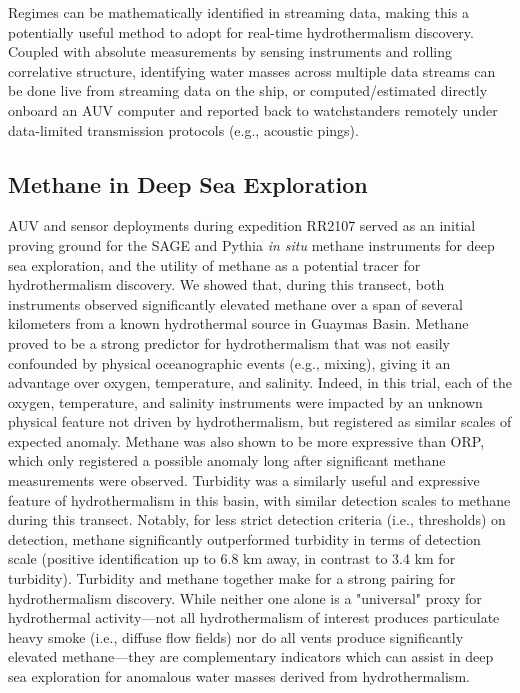 Regimes can be mathematically identified in streaming data, making this a potentially useful method to adopt for real-time hydrothermalism discovery. Coupled with absolute measurements by sensing instruments and rolling correlative structure, identifying water masses across multiple data streams can be done live from streaming data on the ship, or computed/estimated directly onboard an AUV computer and reported back to watchstanders remotely under data-limited transmission protocols (e.g., acoustic pings). 


\subsection{Methane in Deep Sea Exploration}
AUV and sensor deployments during expedition RR2107 served as an initial proving ground for the SAGE and Pythia \emph{in situ} methane instruments for deep sea exploration, and the utility of methane as a potential tracer for hydrothermalism discovery. We showed that, during this transect, both instruments observed significantly elevated methane over a span of several kilometers from a known hydrothermal source in Guaymas Basin. Methane proved to be a strong predictor for hydrothermalism that was not easily confounded by physical oceanographic events (e.g., mixing), giving it an advantage over oxygen, temperature, and salinity. Indeed, in this trial, each of the oxygen, temperature, and salinity instruments were impacted by an unknown physical feature not driven by hydrothermalism, but registered as similar scales of expected anomaly. Methane was also shown to be more expressive than ORP, which only registered a possible anomaly long after significant methane measurements were observed. Turbidity was a similarly useful and expressive feature of hydrothermalism in this basin, with similar detection scales to methane during this transect. Notably, for less strict detection criteria (i.e., thresholds) on detection, methane significantly outperformed turbidity in terms of detection scale (positive identification up to 6.8 km away, in contrast to 3.4 km for turbidity). Turbidity and methane together make for a strong pairing for hydrothermalism discovery. While neither one alone is a "universal" proxy for hydrothermal activity---not all hydrothermalism of interest produces particulate heavy smoke (i.e., diffuse flow fields) nor do all vents produce significantly elevated methane---they are complementary indicators which can assist in deep sea exploration for anomalous water masses derived from hydrothermalism. 

